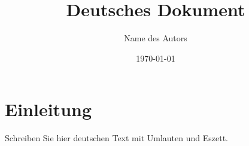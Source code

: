 \documentclass[11pt,a4paper]{article}
\title{Deutsches Dokument}
\author{Name des Autors}
\date{\today}
\begin{document}
\maketitle
\section{Einleitung}
Schreiben Sie hier deutschen Text mit Umlauten und Eszett.
\end{document}
